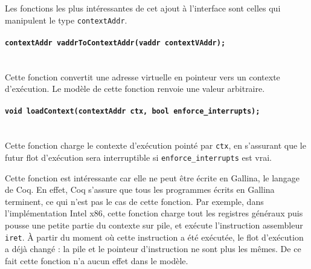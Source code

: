 %

		Les fonctions les plus intéressantes de cet ajout à l'interface sont celles qui manipulent le type \texttt{contextAddr}.

		\paragraph{\texttt{contextAddr vaddrToContextAddr(vaddr contextVAddr);}}~\\
		Cette fonction convertit une adresse virtuelle en pointeur vers un contexte d'exécution. Le modèle de cette fonction renvoie une valeur arbitraire.

		\paragraph{\texttt{void loadContext(contextAddr ctx, bool enforce_interrupts);}}~\\
		Cette fonction charge le contexte d'exécution pointé par \texttt{ctx}, en s'assurant que le futur flot d'exécution sera interruptible si \texttt{enforce\_interrupts} est vrai.

		Cette fonction est intéressante car elle ne peut être écrite en Gallina, le langage de Coq. En effet, Coq s'assure que tous les programmes écrits en Gallina terminent, ce qui n'est pas le cas de cette fonction. Par exemple, dans l'implémentation Intel x86, cette fonction charge tout les registres généraux puis pousse une petite partie du contexte sur pile, et exécute l'instruction assembleur \texttt{iret}. À partir du moment où cette instruction a été exécutée, le flot d'exécution a déjà changé : la pile et le pointeur d'instruction ne sont plus les mêmes. De ce fait cette fonction n'a aucun effet dans le modèle.

